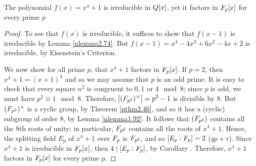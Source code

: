 \documentclass[11pt]{article}
\begin{document}
\begin{proposition}[]
The polynomial \(f(x)=x^4+1\) is irreducible in \(\relax{Q}[x]\), yet it factors in 
\(\relax{F}_p[x]\) for every prime \(p\)
\end{proposition}

\begin{proof}
To see that \(f(x)\) is irreducible, it suffices to show that \(f(x-1)\) is
irreducible by Lemma \ref{nlemma2.74}. But \(f(x-1)=x^4-4x^3+6x^2-4x+2\) is
irreducible, by Eisenstein's Criterion.

We now show for all prime \(p\), that \(x^4+1\) factors in \(\relax{F}_p[x]\). If
\(p=2\), then \(x^4+1=(x+1)^4\) and so we may assume that \(p\) is an odd
prime. It is easy to check that every square \(n^2\) is congruent to \(0,1\)
or \(4\mod 8\); since \(p\) is odd, we must have \(p^2\equiv1\mod8\).
Therefore, \(\abs{(\relax{F}_{p^2})^\times}=p^2-1\) is divisible by 8. But 
\((\relax{F}_{p^2})^\times\) is a cyclic group, by Theorem \ref{nthm2.46}, and so it
has a (cyclic) subgroup of order 8, by Lemma \ref{nlemma1.92}. It follows that 
\((\relax{F}_{p^2})\) contains all the 8th roots of unity; in particular,
\(\relax{F}_{p^2}\) contains all the roots of \(x^4+1\). Hence, the splitting field
\(E_p\) of \(x^4+1\) over \(\relax{F}_{p}\) is \(\relax{F}_{p^2}\), and so \([E_p:\relax{F}_p]=2\)
(\(qp+r\)). Since \(x^4+1\) is irreducible in \(\relax{F}_p[x]\), then 
\(4\mid[E_p:\relax{F}_p]\), by Corollary \label{ncor3.9}. Therefore, \(x^4+1\) factors
in \(\relax{F}_p[x]\) for every prime \(p\).
\end{proof}
\end{document}
